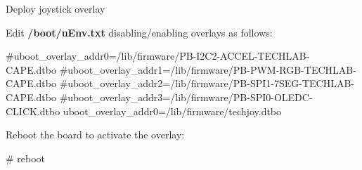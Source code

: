 \begin{frame}
	{Deploy joystick overlay}

	Edit \textbf{/boot/uEnv.txt} disabling/enabling overlays as follows:
	\begin{raw}
#uboot_overlay_addr0=/lib/firmware/PB-I2C2-ACCEL-TECHLAB-CAPE.dtbo
#uboot_overlay_addr1=/lib/firmware/PB-PWM-RGB-TECHLAB-CAPE.dtbo
#uboot_overlay_addr2=/lib/firmware/PB-SPI1-7SEG-TECHLAB-CAPE.dtbo
#uboot_overlay_addr3=/lib/firmware/PB-SPI0-OLEDC-CLICK.dtbo
uboot_overlay_addr0=/lib/firmware/techjoy.dtbo
	\end{raw}

	Reboot the board to activate the overlay:
	\begin{raw}
# reboot
	\end{raw}
\end{frame}
